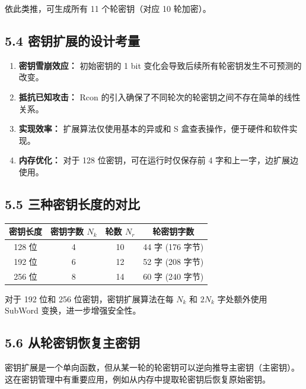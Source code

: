\documentclass[12pt, a4paper]{article}
\begin{document}
依此类推，可生成所有 11 个轮密钥（对应 10 轮加密）。

\subsection{5.4 密钥扩展的设计考量}

\begin{enumerate}
    \item \textbf{密钥雪崩效应：} 初始密钥的 1 bit 变化会导致后续所有轮密钥发生不可预测的改变。
    \item \textbf{抵抗已知攻击：} Rcon 的引入确保了不同轮次的轮密钥之间不存在简单的线性关系。
    \item \textbf{实现效率：} 扩展算法仅使用基本的异或和 S 盒查表操作，便于硬件和软件实现。
    \item \textbf{内存优化：} 对于 128 位密钥，可在运行时仅保存前 4 字和上一字，边扩展边使用。
\end{enumerate}

\subsection{5.5 三种密钥长度的对比}

\begin{tcolorbox}[notebox=参数对比]
\begin{center}
\begin{tabular}{c|c|c|c}
\hline
\textbf{密钥长度} & \textbf{密钥字数 $N_k$} & \textbf{轮数 $N_r$} & \textbf{轮密钥字数} \\
\hline
128 位 & 4 & 10 & 44 字 (176 字节) \\
192 位 & 6 & 12 & 52 字 (208 字节) \\
256 位 & 8 & 14 & 60 字 (240 字节) \\
\hline
\end{tabular}
\end{center}
\end{tcolorbox}

对于 192 位和 256 位密钥，密钥扩展算法在每 $N_k$ 和 $2N_k$ 字处额外使用 SubWord 变换，进一步增强安全性。

\subsection{5.6 从轮密钥恢复主密钥}

密钥扩展是一个单向函数，但从某一轮的轮密钥可以逆向推导主密钥（主密钥）。这在密钥管理中有重要应用，例如从内存中提取轮密钥后恢复原始密钥。
\end{document}
